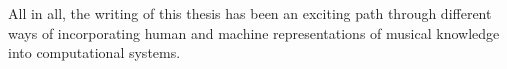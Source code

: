 
All in all, the writing of this thesis has been an exciting path through different ways of incorporating human and machine representations of musical knowledge into computational systems.





